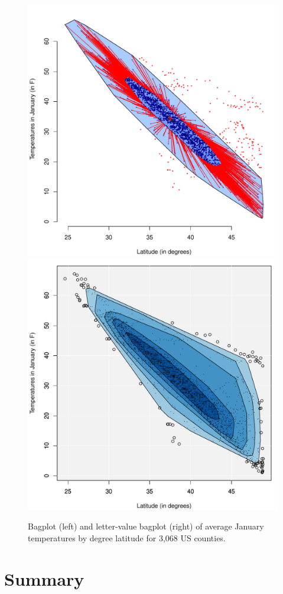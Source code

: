 \documentclass[12pt,oneside]{article}
\begin{document}
\begin{figure}[hbtp]
  \centering
  \includegraphics[width=0.5\linewidth]{images/counties-bag}%
  \includegraphics[width=0.5\linewidth]{images/counties-lvbag}

  \caption{Bagplot (left) and letter-value bagplot (right) of average January
  temperatures by degree latitude for 3,068 US counties. }

  \label{counties-bag} 

\end{figure}

\section{Summary}
\label{sec:summary}
\end{document}
